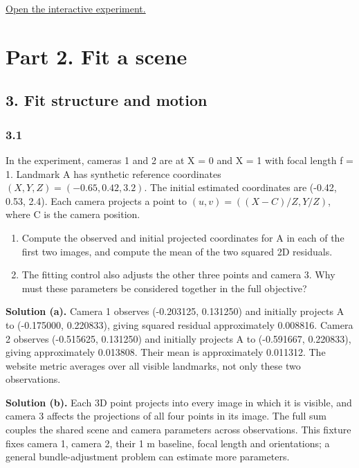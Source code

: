 \documentclass[11pt,a4paper]{article}
\begin{document}
\par\medskip
\noindent\href{https://sosekie.github.io/Unibe-CVG-CV-Interactive-Labs/tutorial-10/#learning}{Open the interactive experiment.}
\section*{Part 2. Fit a scene}
\subsection*{3. Fit structure and motion}
\par
\noindent
\begin{minipage}{\linewidth}
\subsubsection*{3.1}
In the experiment, cameras 1 and 2 are at X = 0 and X = 1 with focal length f = 1.
Landmark A has synthetic reference coordinates $(X,Y,Z)=(-0.65,0.42,3.2)$.
The initial estimated coordinates are (-0.42, 0.53, 2.4).
Each camera projects a point to $(u,v)=((X-C)/Z,Y/Z)$, where C is the camera position.
\begin{enumerate}[label=(\alph*),nosep]
\item Compute the observed and initial projected coordinates for A in each of the first two images, and compute the mean of the two squared 2D residuals.
\item The fitting control also adjusts the other three points and camera 3.
Why must these parameters be considered together in the full objective?
\end{enumerate}
\noindent\textbf{Solution (a).} Camera 1 observes (-0.203125, 0.131250) and initially projects A to (-0.175000, 0.220833), giving squared residual approximately 0.008816.
Camera 2 observes (-0.515625, 0.131250) and initially projects A to (-0.591667, 0.220833), giving approximately 0.013808.
Their mean is approximately 0.011312.
The website metric averages over all visible landmarks, not only these two observations.

\noindent\textbf{Solution (b).} Each 3D point projects into every image in which it is visible, and camera 3 affects the projections of all four points in its image.
The full sum couples the shared scene and camera parameters across observations.
This fixture fixes camera 1, camera 2, their 1 m baseline, focal length and orientations; a general bundle-adjustment problem can estimate more parameters.
\end{minipage}
\end{document}
